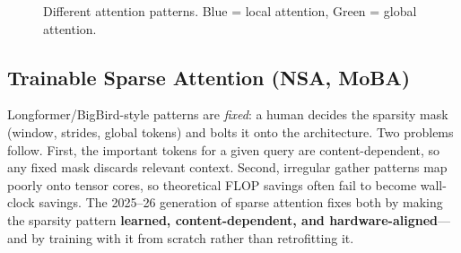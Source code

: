 \begin{figure}[H]
\centering
{}
\caption{Different attention patterns. Blue = local attention, Green = global attention.}
\label{fig:attention_patterns}
\end{figure}

\subsection{Trainable Sparse Attention (NSA, MoBA)}
\label{sec:trainable_sparse}

Longformer/BigBird-style patterns are \textit{fixed}: a human decides the sparsity mask (window, strides, global tokens) and bolts it onto the architecture. Two problems follow. First, the important tokens for a given query are content-dependent, so any fixed mask discards relevant context. Second, irregular gather patterns map poorly onto tensor cores, so theoretical FLOP savings often fail to become wall-clock savings. The 2025--26 generation of sparse attention fixes both by making the sparsity pattern \textbf{learned, content-dependent, and hardware-aligned}---and by training with it from scratch rather than retrofitting it.

